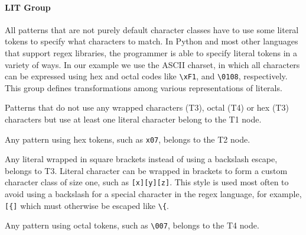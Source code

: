 


\paragraph{LIT Group}
All patterns that are not purely default character classes have to use some literal tokens to specify what characters to match.  In Python and most other languages that support regex libraries, the programmer is able to specify literal tokens in a variety of ways.  In our example we use the ASCII charset, in which all characters can be expressed using hex and octal codes like \verb!\xF1!, and \verb!\0108!, respectively.  This group defines transformations among various representations of literals. 



\begin{description}  \itemsep -1pt
\item[T1:] Patterns that do not use any wrapped characters (T3), octal (T4) or hex (T3) characters but use at least one literal character belong to the T1 node.
\item[T2:] Any pattern using hex tokens, such as \verb!x07!, belongs to the T2 node. 
\item[T3:]  Any literal wrapped in square brackets instead of using a backslash escape, belongs to T3.
Literal character can be wrapped in brackets to form a custom character class of size one, such as \verb![x][y][z]!. This style is used most often to avoid using a backslash for a special character in the regex language, for example, \verb![{]! which must otherwise be escaped like \verb!\{!. 

\item[T4:] Any pattern using octal tokens, such as \verb!\007!, belongs to the T4 node.
\end{description}

